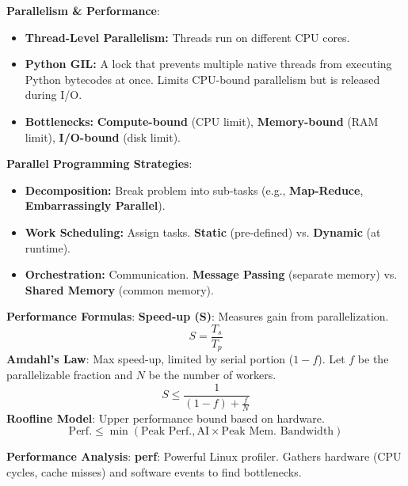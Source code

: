 \documentclass[10pt, a4paper]{article}
\begin{document}
\begin{multicols}{3}
\columnbreak %
\textbf{Parallelism \& Performance}:
\begin{itemize}[nosep] %
    \item \textbf{Thread-Level Parallelism:} Threads run on different CPU cores.
    \item \textbf{Python GIL:} A lock that prevents multiple native threads from executing Python bytecodes at once. Limits CPU-bound parallelism but is released during I/O.
    \item \textbf{Bottlenecks:} \textbf{Compute-bound} (CPU limit), \textbf{Memory-bound} (RAM limit), \textbf{I/O-bound} (disk limit).
\end{itemize}

\vspace{1em} %

\textbf{Parallel Programming Strategies}:
\begin{itemize}[nosep] %
    \item \textbf{Decomposition:} Break problem into sub-tasks (e.g., \textbf{Map-Reduce}, \textbf{Embarrassingly Parallel}).
    \item \textbf{Work Scheduling:} Assign tasks. \textbf{Static} (pre-defined) vs. \textbf{Dynamic} (at runtime).
    \item \textbf{Orchestration:} Communication. \textbf{Message Passing} (separate memory) vs. \textbf{Shared Memory} (common memory).
\end{itemize}


\textbf{Performance Formulas}:
\textbf{Speed-up (S)}: Measures gain from parallelization.
$$ S = \frac{T_{s}}{T_{p}} $$
\textbf{Amdahl's Law}: Max speed-up, limited by serial portion ($1-f$). Let $f$ be the parallelizable fraction and $N$ be the number of workers.
$$ S \le \frac{1}{(1-f) + \frac{f}{N}} $$
\textbf{Roofline Model}: Upper performance bound based on hardware.
$$ \text{Perf.} \le \min(\text{Peak Perf.}, \text{AI} \times \text{Peak Mem. Bandwidth}) $$

\textbf{Performance Analysis}:
\textbf{perf}: Powerful Linux profiler. Gathers hardware (CPU cycles, cache misses) and software events to find bottlenecks.


\end{multicols}
\end{document}
